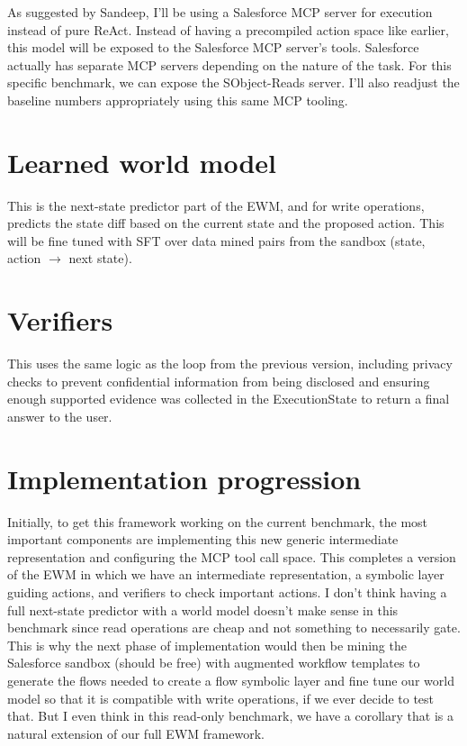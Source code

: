 \documentclass[11pt]{article}
\begin{document}
As suggested by Sandeep, I’ll be using a Salesforce MCP server for execution instead of pure ReAct. Instead of having a precompiled action space like earlier, this model will be exposed to the Salesforce MCP server’s tools. Salesforce actually has separate MCP servers depending on the nature of the task. For this specific benchmark, we can expose the SObject-Reads server. I’ll also readjust the baseline numbers appropriately using this same MCP tooling.

\section*{Learned world model}

This is the next-state predictor part of the EWM, and for write operations, predicts the state diff based on the current state and the proposed action. This will be fine tuned with SFT over data mined pairs from the sandbox (state, action $\rightarrow$ next state).

\section*{Verifiers}

This uses the same logic as the loop from the previous version, including privacy checks to prevent confidential information from being disclosed and ensuring enough supported evidence was collected in the ExecutionState to return a final answer to the user.

\section*{Implementation progression}

Initially, to get this framework working on the current benchmark, the most important components are implementing this new generic intermediate representation and configuring the MCP tool call space. This completes a version of the EWM in which we have an intermediate representation, a symbolic layer guiding actions, and verifiers to check important actions. I don’t think having a full next-state predictor with a world model doesn’t make sense in this benchmark since read operations are cheap and not something to necessarily gate. This is why the next phase of implementation would then be mining the Salesforce sandbox (should be free) with augmented workflow templates to generate the flows needed to create a flow symbolic layer and fine tune our world model so that it is compatible with write operations, if we ever decide to test that. But I even think in this read-only benchmark, we have a corollary that is a natural extension of our full EWM framework.
\end{document}
